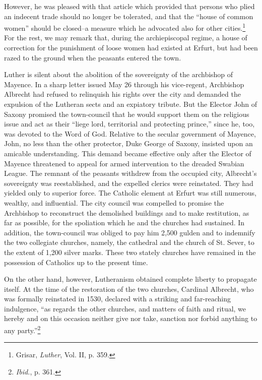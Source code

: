 However, he was pleased with that article which provided that
persons who plied an indecent trade should no longer be tolerated,
and that the “house of common women” should be closed--a measure
which he advocated also for other cities.\footnote{Grisar, \textit{Luther}, Vol. II, p. 359.}
For the rest, we may remark
that, during the archiepiscopal regime, a house of correction
for the punishment of loose women had existed at Erfurt, but had
been razed to the ground when the peasants entered the town.

Luther is silent about the abolition of the sovereignty of the
archbishop of Mayence. In a sharp letter issued May 26 through
his vice-regent, Archbishop Albrecht had refused to relinquish his
rights over the city and demanded the expulsion of the Lutheran
sects and an expiatory tribute. But the Elector John of Saxony
promised the town-council that he would support them on the religious
issue and act as their “liege lord, territorial and protecting
prince,” since he, too, was devoted to the Word of God. Relative
to the secular government of Mayence, John, no less than the other
protector, Duke George of Saxony, insisted upon an amicable understanding.
This demand became effective only after the Elector of
Mayence threatened to appeal for armed intervention to the dreaded
Swabian League. The remnant of the peasants withdrew from the
occupied city, Albrecht’s sovereignty was reestablished, and the expelled
clerics were reinstated. They had yielded only to superior
force. The Catholic element at Erfurt was still numerous, wealthy,
and influential. The city council was compelled to promise the
Archbishop to reconstruct the demolished buildings and to make
restitution, as far as possible, for the spoliation which he and the
churches had sustained. In addition, the town-council was obliged
to pay him 2,500 gulden and to indemnify the two collegiate churches,
namely, the cathedral and the church of St. Sever, to the extent of
1,200 silver marks. These two stately churches have remained in
the possession of Catholics up to the present time.

On the other hand, however, Lutheranism obtained complete liberty to propagate
itself. At the time of the restoration of the two
churches, Cardinal Albrecht, who was formally reinstated in 1530,
declared with a striking and far-reaching indulgence, “as regards the
other churches, and matters of faith and ritual, we hereby and on this
occasion neither give nor take, sanction nor forbid anything to any
party.”\footnote{\textit{Ibid.}, p. 361.}

